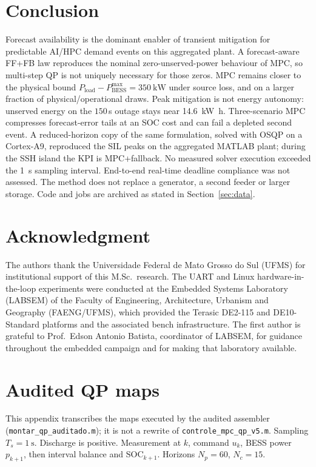 \documentclass{ieeeaccess}
\begin{document}
\section{Conclusion}
\label{sec:conclusion}
Forecast availability is the dominant enabler of transient mitigation for predictable AI/HPC demand events on this aggregated plant. A forecast-aware FF+FB law reproduces the nominal zero-unserved-power behaviour of MPC, so multi-step QP is not uniquely necessary for those zeros. MPC remains closer to the physical bound $P_{\mathrm{load}}-P_{\mathrm{BESS}}^{\max}=\SI{350}{\kilo\watt}$ under source loss, and on a larger fraction of physical/operational draws. Peak mitigation is not energy autonomy: unserved energy on the $150$\,s outage stays near \SI{14.6}{\kilo\watt\hour}. Three-scenario MPC compresses forecast-error tails at an SOC cost and can fail a depleted second event. A reduced-horizon copy of the same formulation, solved with OSQP on a Cortex-A9, reproduced the SIL peaks on the aggregated MATLAB plant; during the SSH island the KPI is MPC+fallback. No measured solver execution exceeded the \SI{1}{\second} sampling interval. End-to-end real-time deadline compliance was not assessed. The method does not replace a generator, a second feeder or larger storage. Code and jobs are archived as stated in Section~\ref{sec:data}.

\section*{Acknowledgment}
The authors thank the Universidade Federal de Mato Grosso do Sul (UFMS) for institutional support of this M.Sc.\ research. The UART and Linux hardware-in-the-loop experiments were conducted at the Embedded Systems Laboratory (LABSEM) of the Faculty of Engineering, Architecture, Urbanism and Geography (FAENG/UFMS), which provided the Terasic DE2-115 and DE10-Standard platforms and the associated bench infrastructure. The first author is grateful to Prof.\ Edson Antonio Batista, coordinator of LABSEM, for guidance throughout the embedded campaign and for making that laboratory available.

\appendices
\section{Audited QP maps}
\label{sec:appqp}

This appendix transcribes the maps executed by the audited assembler (\texttt{montar\_qp\_auditado.m}); it is not a rewrite of \texttt{controle\_mpc\_qp\_v5.m}. Sampling $T_s=\SI{1}{\second}$. Discharge is positive. Measurement at $k$, command $u_k$, BESS power $p_{k+1}$, then interval balance and $\mathrm{SOC}_{k+1}$. Horizons $N_p=60$, $N_c=15$.
\end{document}
